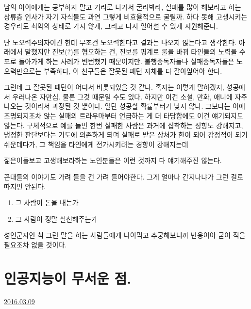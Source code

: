 남의 아이에게는 공부하지 말고 거리로 나가서 굴러봐라, 실패를 많이 해보라고 하는 상류층 인사가
자기 자식들도 과연 그렇게 비효율적으로 굴릴까.
하다 못해 고생시키는 경우라도 최악의 상태로 가지 않게,
그리고 다시 일어설 수 있게 지원해준다.
\vspace{5mm}

난 노오력주의자이긴 한데 무조건 노오력한다고 결과는 나오지 않는다고 생각한다.
아래에서 말했지만 진보(?)를 혐오하는 건, 진보를 핑계로 룰을 바꿔 타인들의 노력을 수포로 돌아가게 하는 사례가 빈번했기 때문이지만.
불행중독자들나 실패중독자들은 노오력만으로는 부족하다, 이 친구들은 잘못된 패턴 자체를 다 갈아엎어야 한다.
\vspace{5mm}

그런데 그 잘못된 패턴이 어디서 비롯되었을 것 같나. 혹자는 이렇게 말하겠지, 성공에서 우러나온 자만심.
물론 그것 때문일 수도 있다. 하지만 이건 소설, 만화, 애니에 자주 나오는 것이라서 과장된 것 뿐이다. 일단 성공할 확률부터가 낮지 않나.
그보다는 아예 조명되지조차 않는 실패의 트라우마부터 언급하는 게 더 타당함에도 이건 얘기되지도 않는다.
구체적으로 예를 들면 한번 실패한 사람은 과거에 집착하는 성향도 강해지고, 냉정한 판단보다는 기도에 의존하게 되며
실패로 받은 상처가 한이 되어 감정적이 되기 쉬운데다가, 그 책임을 타인에게 전가시키려는 경향이 강해지는데
\vspace{5mm}

젊은이들보고 고생해보라하는 노인분들은 이런 것까지 다 얘기해주진 않는다.
\vspace{5mm}

꼰대들의 이야기도 가려 들을 건 가려 들어야한다. 그게 얼마나 간지나냐가 그런 걸로 따지면 안된다.
\vspace{5mm}
\begin{enumerate}
    \item  그 사람이 돈을 내는가
    \item  그 사람이 정말 실천해주는가
\end{enumerate}
\vspace{5mm}

성인군자인 척 그런 말을 하는 사람들에게 나이먹고 추궁해보니까 반응이야 굳이 적을 필요조차 없을 것이다.
\vspace{5mm}






\section{인공지능이 무서운 점.}
\href{https://www.kockoc.com/Apoc/670160}{2016.03.09}


